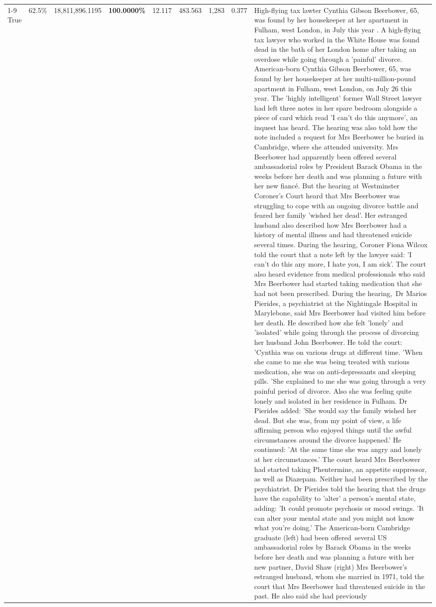 \begin{table}[H]
\begin{tabular}{lllrlllll}
\cline{1-9}
True & 62.5\% & 18,811,896.1195 & \bfseries \color{red} 100.0000\% & 12.117 & 483.563 & 1,283 & 0.377 & High-flying tax lawter Cynthia Gibson Beerbower, 65, was found by her housekeeper at her apartment in Fulham, west London, in July this year . A high-flying tax lawyer who worked in the White House was found dead in the bath of her London home after taking an overdose while going through a 'painful' divorce. American-born Cynthia Gibson Beerbower, 65, was found by her housekeeper at her multi-million-pound apartment in Fulham, west London, on July 26 this year. The 'highly intelligent' former Wall Street lawyer had left three notes in her spare bedroom alongside a piece of card which read 'I can't do this anymore', an inquest has heard. The hearing was also told how the note included a request for Mrs Beerbower be buried in Cambridge, where she attended university. Mrs Beerbower had apparently been offered several ambassadorial roles by President Barack Obama in the weeks before her death and was planning a future with her new fiancé. But the hearing at Westminster Coroner's Court heard that Mrs Beerbower was struggling to cope with an ongoing divorce battle and feared her family 'wished her dead'. Her estranged husband also described how Mrs Beerbower had a history of mental illness and had threatened suicide several times. During the hearing, Coroner Fiona Wilcox told the court that a note left by the lawyer said: 'I can't do this any more, I hate you, I am sick'. The court also heard evidence from medical professionals who said Mrs Beerbower had started taking medication that she had not been prescribed. During the hearing, Dr Marios Pierides, a psychiatrist at the Nightingale Hospital in Marylebone, said Mrs Beerbower had visited him before her death. He described how she felt 'lonely' and 'isolated' while going through the process of divorcing her husband John Beerbower. He told the court: 'Cynthia was on various drugs at different time. 'When she came to me she was being treated with various medication, she was on anti-depressants and sleeping pills. 'She explained to me she was going through a very painful period of divorce. Also she was feeling quite lonely and isolated in her residence in Fulham. Dr Pierides added: 'She would say the family wished her dead. But she was, from my point of view, a life affirming person who enjoyed things until the awful circumstances around the divorce happened.' He continued: 'At the same time she was angry and lonely at her circumstances.' The court heard Mrs Beerbower had started taking Phentermine, an appetite suppressor, as well as Diazepam. Neither had been prescribed by the psychiatrist. Dr Pierides told the hearing that the drugs have the capability to 'alter' a person's mental state, adding: 'It could promote psychosis or mood swings. 'It can alter your mental state and you might not know what you're doing.' The American-born Cambridge graduate (left) had been offered several US ambassadorial roles by Barack Obama in the weeks before her death and was planning a future with her new partner, David Shaw (right) Mrs Beerbower's estranged husband, whom she married in 1971, told the court that Mrs Beerbower had threatened suicide in the past. He also said she had previously 
\end{tabular}
\end{table}
